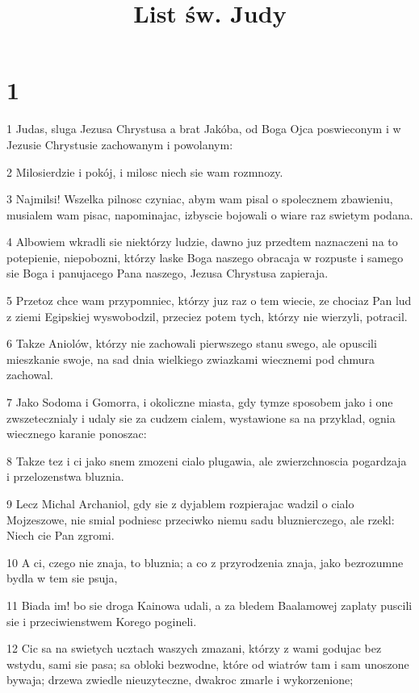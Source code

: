 

\title{List św. Judy}


\chapter{1}

\par 1 Judas, sluga Jezusa Chrystusa a brat Jakóba, od Boga Ojca poswieconym i w Jezusie Chrystusie zachowanym i powolanym:
\par 2 Milosierdzie i pokój, i milosc niech sie wam rozmnozy.
\par 3 Najmilsi! Wszelka pilnosc czyniac, abym wam pisal o spolecznem zbawieniu, musialem wam pisac, napominajac, izbyscie bojowali o wiare raz swietym podana.
\par 4 Albowiem wkradli sie niektórzy ludzie, dawno juz przedtem naznaczeni na to potepienie, niepobozni, którzy laske Boga naszego obracaja w rozpuste i samego sie Boga i panujacego Pana naszego, Jezusa Chrystusa zapieraja.
\par 5 Przetoz chce wam przypomniec, którzy juz raz o tem wiecie, ze chociaz Pan lud z ziemi Egipskiej wyswobodzil, przeciez potem tych, którzy nie wierzyli, potracil.
\par 6 Takze Aniolów, którzy nie zachowali pierwszego stanu swego, ale opuscili mieszkanie swoje, na sad dnia wielkiego zwiazkami wiecznemi pod chmura zachowal.
\par 7 Jako Sodoma i Gomorra, i okoliczne miasta, gdy tymze sposobem jako i one zwszetecznialy i udaly sie za cudzem cialem, wystawione sa na przyklad, ognia wiecznego karanie ponoszac:
\par 8 Takze tez i ci jako snem zmozeni cialo plugawia, ale zwierzchnoscia pogardzaja i przelozenstwa bluznia.
\par 9 Lecz Michal Archaniol, gdy sie z dyjablem rozpierajac wadzil o cialo Mojzeszowe, nie smial podniesc przeciwko niemu sadu bluznierczego, ale rzekl: Niech cie Pan zgromi.
\par 10 A ci, czego nie znaja, to bluznia; a co z przyrodzenia znaja, jako bezrozumne bydla w tem sie psuja,
\par 11 Biada im! bo sie droga Kainowa udali, a za bledem Baalamowej zaplaty puscili sie i przeciwienstwem Korego pogineli.
\par 12 Cic sa na swietych ucztach waszych zmazani, którzy z wami godujac bez wstydu, sami sie pasa; sa obloki bezwodne, które od wiatrów tam i sam unoszone bywaja; drzewa zwiedle nieuzyteczne, dwakroc zmarle i wykorzenione;
